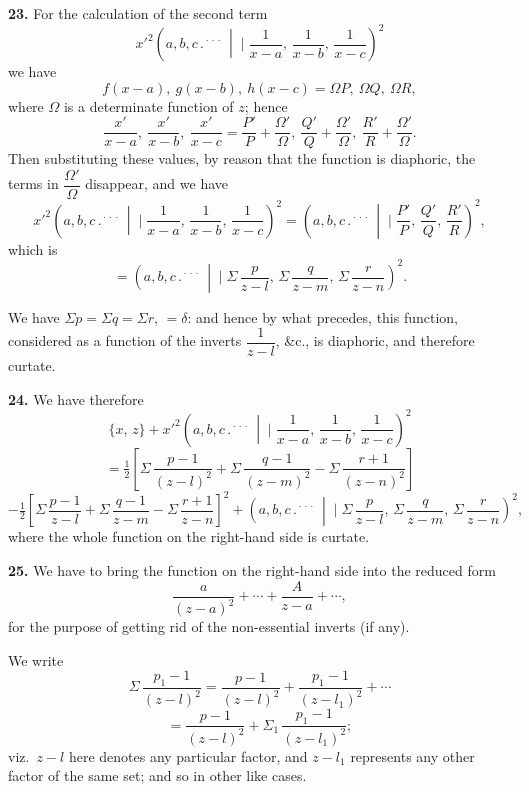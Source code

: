 \documentclass[11pt]{article}
\newcommand{\artno}[1]{\textbf{#1.}\quad}
\begin{document}
\artno{23} For the calculation of the second term
\[
   x'^{2}\!\left(a, b, c \,.{}^{\!\cdot\!\cdot\!\cdot}\,\middle|\!\!\!\mid \frac{1}{x-a},\,\frac{1}{x-b},\,\frac{1}{x-c}\right)^{\!2}
\]
we have
\[
   f(x-a),\ g(x-b),\ h(x-c) = \Omega P,\ \Omega Q,\ \Omega R,
\]
where $\Omega$ is a determinate function of $z$; hence
\[
   \frac{x'}{x-a},\ \frac{x'}{x-b},\ \frac{x'}{x-c} = \frac{P'}{P} + \frac{\Omega'}{\Omega},\ \frac{Q'}{Q} + \frac{\Omega'}{\Omega},\ \frac{R'}{R} + \frac{\Omega'}{\Omega}.
\]
Then substituting these values, by reason that the function is diaphoric, the terms
in $\dfrac{\Omega'}{\Omega}$ disappear, and we have
\[
   x'^{2}\!\left(a, b, c \,.{}^{\!\cdot\!\cdot\!\cdot}\,\middle|\!\!\!\mid \frac{1}{x-a},\,\frac{1}{x-b},\,\frac{1}{x-c}\right)^{\!2}
   = \left(a, b, c \,.{}^{\!\cdot\!\cdot\!\cdot}\,\middle|\!\!\!\mid \frac{P'}{P},\,\frac{Q'}{Q},\,\frac{R'}{R}\right)^{\!2},
\]
which is
\[
   = \left(a, b, c \,.{}^{\!\cdot\!\cdot\!\cdot}\,\middle|\!\!\!\mid \Sigma\,\frac{p}{z-l},\,\Sigma\,\frac{q}{z-m},\,\Sigma\,\frac{r}{z-n}\right)^{\!2}.
\]

We have $\Sigma p = \Sigma q = \Sigma r$, $= \delta$: and hence by what precedes, this function, considered as
a function of the inverts $\dfrac{1}{z-l}$, \&c., is diaphoric, and therefore curtate.

\artno{24} We have therefore
\[
   \{x,\,z\} + x'^{2}\!\left(a, b, c \,.{}^{\!\cdot\!\cdot\!\cdot}\,\middle|\!\!\!\mid \frac{1}{x-a},\,\frac{1}{x-b},\,\frac{1}{x-c}\right)^{\!2}
\]
\[
   = \tfrac{1}{2}\!\left[\Sigma\,\frac{p-1}{(z-l)^{2}} + \Sigma\,\frac{q-1}{(z-m)^{2}} - \Sigma\,\frac{r+1}{(z-n)^{2}}\right]
\]
\[
   - \tfrac{1}{2}\!\left[\Sigma\,\frac{p-1}{z-l} + \Sigma\,\frac{q-1}{z-m} - \Sigma\,\frac{r+1}{z-n}\right]^{\!2}
   + \left(a, b, c \,.{}^{\!\cdot\!\cdot\!\cdot}\,\middle|\!\!\!\mid \Sigma\,\frac{p}{z-l},\,\Sigma\,\frac{q}{z-m},\,\Sigma\,\frac{r}{z-n}\right)^{\!2},
\]
where the whole function on the right-hand side is curtate.

\newpage
\artno{25} We have to bring the function on the right-hand side into the reduced form
\[
   \frac{a}{(z-a)^{2}} + \cdots + \frac{A}{z-a} + \cdots,
\]
for the purpose of getting rid of the non-essential inverts (if any).

We write
\[
   \Sigma\,\frac{p_{1}-1}{(z-l)^{2}} = \frac{p-1}{(z-l)^{2}} + \frac{p_{1}-1}{(z-l_{1})^{2}} + \cdots
\]
\[
   = \frac{p-1}{(z-l)^{2}} + \Sigma_{1}\,\frac{p_{1}-1}{(z-l_{1})^{2}};
\]
viz.\ $z-l$ here denotes any particular factor, and $z-l_{1}$ represents any other factor of
the same set; and so in other like cases.
\end{document}

